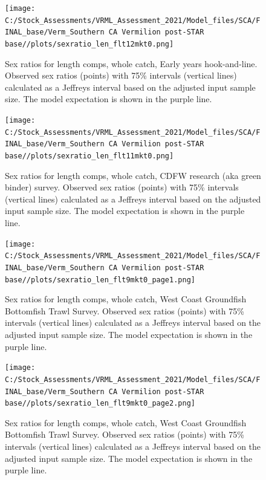 \documentclass[
  english,
  a4paper,
]{article}
\begin{document}
\begin{figure}
\centering
\texttt{[image: C:/Stock\_Assessments/VRML\_Assessment\_2021/Model\_files/SCA/FINAL\_base/Verm\_Southern CA Vermilion post-STAR base//plots/sexratio\_len\_flt12mkt0.png]}
\caption{Sex ratios for length comps, whole catch, Early years hook-and-line. Observed sex ratios (points) with 75\% intervals (vertical lines) calculated as a Jeffreys interval based on the adjusted input sample size. The model expectation is shown in the purple line.\label{fig:sexratio-EARLY-HKL-2}}
\end{figure}

\begin{figure}
\centering
\texttt{[image: C:/Stock\_Assessments/VRML\_Assessment\_2021/Model\_files/SCA/FINAL\_base/Verm\_Southern CA Vermilion post-STAR base//plots/sexratio\_len\_flt11mkt0.png]}
\caption{Sex ratios for length comps, whole catch, CDFW research (aka green binder) survey. Observed sex ratios (points) with 75\% intervals (vertical lines) calculated as a Jeffreys interval based on the adjusted input sample size. The model expectation is shown in the purple line.\label{fig:sexratio-CDFW-RESEARCH-1}}
\end{figure}

\begin{figure}
\centering
\texttt{[image: C:/Stock\_Assessments/VRML\_Assessment\_2021/Model\_files/SCA/FINAL\_base/Verm\_Southern CA Vermilion post-STAR base//plots/sexratio\_len\_flt9mkt0\_page1.png]}
\caption{Sex ratios for length comps, whole catch, West Coast Groundfish Bottomfish Trawl Survey. Observed sex ratios (points) with 75\% intervals (vertical lines) calculated as a Jeffreys interval based on the adjusted input sample size. The model expectation is shown in the purple line.\label{fig:sexratio-NWFSC-TWL-4}}
\end{figure}

\begin{figure}
\centering
\texttt{[image: C:/Stock\_Assessments/VRML\_Assessment\_2021/Model\_files/SCA/FINAL\_base/Verm\_Southern CA Vermilion post-STAR base//plots/sexratio\_len\_flt9mkt0\_page2.png]}
\caption{Sex ratios for length comps, whole catch, West Coast Groundfish Bottomfish Trawl Survey. Observed sex ratios (points) with 75\% intervals (vertical lines) calculated as a Jeffreys interval based on the adjusted input sample size. The model expectation is shown in the purple line.\label{fig:sexratio-NWFSC-TWL-5}}
\end{figure}
\end{document}
